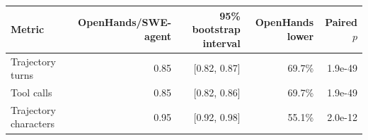\begin{tabular}{lrrrr}
\toprule
Metric & OpenHands/SWE-agent & 95\% bootstrap interval & OpenHands lower & Paired $p$ \\
\midrule
Trajectory turns & 0.85 & [0.82, 0.87] & 69.7\% & 1.9e-49 \\
Tool calls & 0.85 & [0.82, 0.86] & 69.7\% & 1.9e-49 \\
Trajectory characters & 0.95 & [0.92, 0.98] & 55.1\% & 2.0e-12 \\
\bottomrule
\end{tabular}
